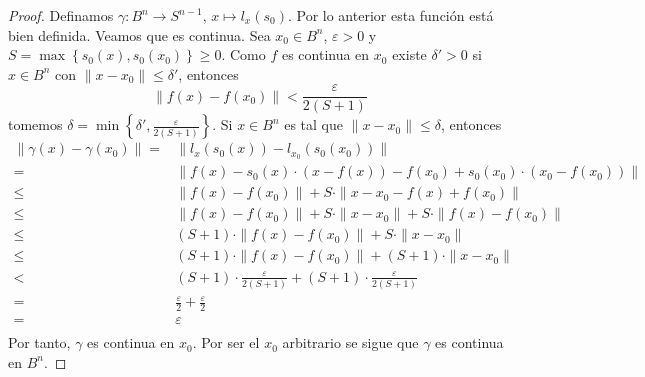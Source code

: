 \documentclass[12pt]{report}
\theoremstyle{largebreak}
\newcommand\cf[3]{\ensuremath{#1:#2\rightarrow#3}}
\begin{document}
\begin{proof}
    Definamos $\cf{\gamma}{B^n}{S^{n-1}}$, $x\mapsto l_x(s_0)$. Por lo anterior esta función está bien definida. Veamos que es continua. Sea $x_0\in B^n$, $\varepsilon>0$ y $S=\max\left\{s_0(x),s_0(x_0)\right\}\geq0$. Como $f$ es continua en $x_0$ existe $\delta'>0$ si $x\in B^n$ con $\|x-x_0\|\leq\delta'$, entonces
    \begin{equation*}
        \|f(x)-f(x_0)\|<\frac{\varepsilon}{2(S+1)}
    \end{equation*}
    tomemos $\delta = \min\left\{\delta',\frac{\varepsilon}{2(S+1)}\right\}$. Si $x\in B^n$ es tal que $\|x-x_0\|\leq\delta$, entonces
    \begin{equation*}
        \begin{split}
            \|\gamma(x)-\gamma(x_0)\|=&\|l_x(s_0(x))-l_{x_0}(s_0(x_0))\|\\
            =&\|f(x)-s_0(x)\cdot\left(x-f(x)\right)-f(x_0)+s_0(x_0)\cdot\left(x_0-f(x_0)\right)\|\\
            \leq&\|f(x)-f(x_0)\|+S\cdot\|x-x_0-f(x)+f(x_0)\|\\
            \leq&\|f(x)-f(x_0)\|+S\cdot\|x-x_0\|+S\cdot\|f(x)-f(x_0)\|\\
            \leq&(S+1)\cdot\|f(x)-f(x_0)\|+S\cdot\|x-x_0\|\\
            \leq&(S+1)\cdot\|f(x)-f(x_0)\|+(S+1)\cdot\|x-x_0\|\\
            <&(S+1)\cdot\frac{\varepsilon}{2(S+1)}+(S+1)\cdot\frac{\varepsilon}{2(S+1)}\\
            =&\frac{\varepsilon}{2}+\frac{\varepsilon}{2}\\
            =&\varepsilon\\
        \end{split}
    \end{equation*}
    Por tanto, $\gamma$ es continua en $x_0$. Por ser el $x_0$ arbitrario se sigue que $\gamma$ es continua en $B^n$.

\end{proof}
\end{document}

